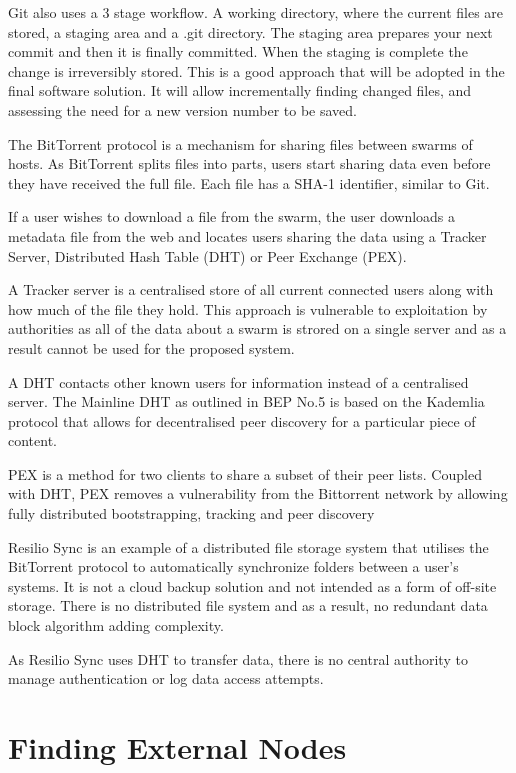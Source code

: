 \documentclass[a4paper,11pt]{article}
\begin{document}
Git also uses a 3 stage workflow. A working directory, where the current files are stored, a staging area and a .git directory. The staging area prepares your next commit and then it is finally committed. When the staging is complete the change is irreversibly stored. This is a good approach that will be adopted in the final software solution. It will allow incrementally finding changed files, and assessing the need for a new version number to be saved.

The BitTorrent protocol is a mechanism for sharing files between swarms of hosts. As BitTorrent splits files into parts, users start sharing data even before they have received the full file. Each file has a SHA-1 identifier, similar to Git.

If a user wishes to download a file from the swarm, the user downloads a metadata file from the web and locates users sharing the data using a Tracker Server, Distributed Hash Table (DHT) or Peer Exchange (PEX).

A Tracker server is a centralised store of all current connected users along with how much of the file they hold. This approach is vulnerable to exploitation by authorities as all of the data about a swarm is strored on a single server and as a result cannot be used for the proposed system.

A DHT contacts other known users for information instead of a centralised server. The Mainline DHT as outlined in BEP No.5 is based on the Kademlia protocol that allows for decentralised peer discovery for a particular piece of content.

PEX is a method for two clients to share a subset of their peer lists. Coupled with DHT, PEX removes a vulnerability from the Bittorrent network by allowing fully distributed bootstrapping, tracking and peer discovery

Resilio Sync is an example of a distributed file storage system that utilises the BitTorrent protocol to automatically synchronize folders between a user’s systems. It is not a cloud backup solution and not intended as a form of off-site storage. There is no distributed file system and as a result, no redundant data block algorithm adding complexity.

As Resilio Sync uses DHT to transfer data, there is no central authority to manage authentication or log data access attempts.


\section{Finding External Nodes}
\end{document}

